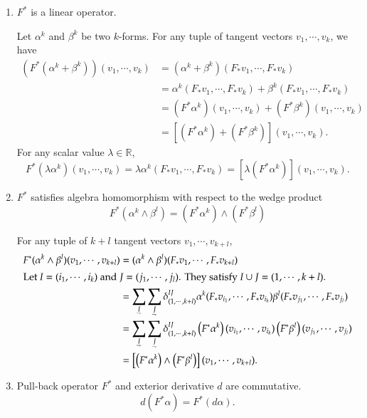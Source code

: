 \documentclass[11pt, a4paper]{book}
\begin{document}
\begin{enumerate}
\item $F^{*}$ is a linear operator.
  \begin{Proof}
    Let $\alpha^k$ and $\beta^k$ be two $k$-forms. For any tuple of tangent vectors
    $v_1,\cdots,v_k$, we have
    \begin{align*}
      \left( F^{*} (\alpha^k + \beta^k) \right) (v_1,\cdots,v_k)
      &= (\alpha^k+\beta^k)(F_{*}v_1,\cdots,F_{*}v_k) \\
      &= \alpha^k(F_{*}v_1,\cdots,F_{*}v_k) + \beta^k(F_{*}v_1,\cdots,F_{*}v_k) \\
      &= \left( F^{*}\alpha^k \right)(v_1,\cdots,v_k) + \left( F^{*}\beta^k
        \right)(v_1,\cdots,v_k) \\
      &= \left[ \left( F^{*}\alpha^k \right) + \left( F^{*}\beta^k \right) \right]
        (v_1,\cdots,v_k).
    \end{align*}
    For any scalar value $\lambda \in \mathbb{R}$,
    \begin{equation*}
      F^{*}(\lambda\alpha^k)(v_1,\cdots,v_k) = \lambda\alpha^k(F_{*}v_1,\cdots,F_{*}v_k) =
      \left[ \lambda \left( F^{*}\alpha^k \right) \right](v_1,\cdots,v_k).
    \end{equation*}
  \end{Proof}
\item $F^{*}$ satisfies algebra homomorphism with respect to the wedge product
  \begin{equation}
    F^{*} \left( \alpha^k \wedge \beta^l \right) = \left( F^{*}\alpha^k \right) \wedge \left( F^{*}\beta^l \right)
  \end{equation}
  \begin{Proof}
    For any tuple of $k+l$ tangent vectors $v_1,\cdots,v_{k+l}$,
    \begin{align*}
      F^{*}(\alpha^k \wedge \beta^l)(v_1,\cdots,v_{k+l})
      &= (\alpha^k \wedge \beta^l)(F_{*}v_1,\cdots,F_{*}v_{k+l}) \\
      \intertext{Let $I = (i_1,\cdots,i_k)$ and $J = (j_1,\cdots,j_l)$. They satisfy $I
      \cup J = (1,\cdots,k+l)$.}
      &=
        \sum_{\underaccent{\rightharpoondown}{I}}\sum_{\underaccent{\rightharpoondown}{J}}
        \delta_{(1,\cdots,k+l)}^{IJ} \alpha^k(F_{*}v_{i_1},\cdots,F_{*}v_{i_k})
        \beta^l(F_{*}v_{j_1},\cdots,F_{*}v_{j_l}) \\
      &=
        \sum_{\underaccent{\rightharpoondown}{I}}\sum_{\underaccent{\rightharpoondown}{J}}
        \delta_{(1,\cdots,k+l)}^{IJ} \left( F^{*}\alpha^k \right)(v_{i_1},\cdots,v_{i_k})
        \left( F^{*}\beta^l \right)(v_{j_1},\cdots,v_{j_l}) \\
      &= \left[ \left( F^{*}\alpha^k \right) \wedge \left( F^{*}\beta^l \right)\right]
        (v_1,\cdots,v_{k+l}).
    \end{align*}
  \end{Proof}
\item Pull-back operator $F^{*}$ and exterior derivative $d$ are commutative.
  \begin{equation}
    d \left( F^{*}\alpha \right) = F^{*}(d\alpha).
  \end{equation}


\end{enumerate}
\end{document}
